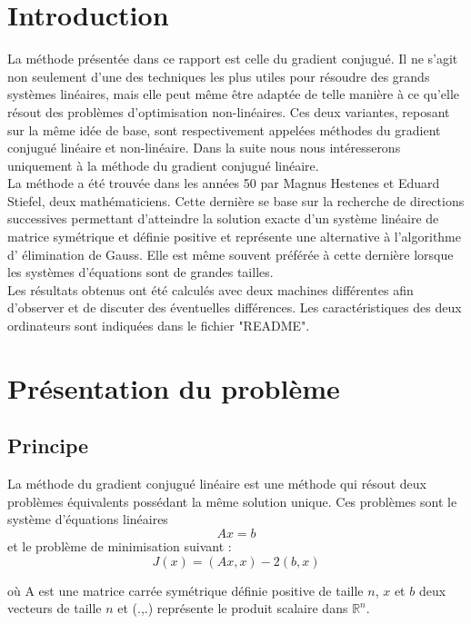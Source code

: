 \documentclass[12,french]{report}
\begin{document}
\tableofcontents

\listoffigures

\renewcommand{\chaptername}{}
\chapter*{Introduction}

La méthode présentée dans ce rapport est celle du gradient conjugué. Il ne s'agit non seulement d'une des techniques les plus utiles pour résoudre des grands systèmes linéaires, mais elle peut même être adaptée de telle manière à ce qu'elle résout des problèmes d'optimisation non-linéaires. Ces deux variantes, reposant sur la même idée de base, sont respectivement appelées méthodes du gradient conjugué linéaire et non-linéaire. Dans la suite nous nous intéresserons uniquement à la méthode du gradient conjugué linéaire.\\

La méthode a été trouvée dans les années 50 par Magnus Hestenes et Eduard Stiefel, deux mathématiciens. Cette dernière se base sur la recherche de directions successives permettant d’atteindre la solution exacte d’un système linéaire de matrice symétrique et définie positive et représente une alternative à l’algorithme d’ élimination de Gauss. Elle est même souvent préférée à cette dernière lorsque les systèmes d’équations sont de grandes tailles.\\

Les résultats obtenus ont été calculés avec deux machines différentes afin d'observer et de discuter des éventuelles différences. Les caractéristiques des deux ordinateurs sont indiquées dans le fichier "README".


\chapter{Présentation du problème}

\section{Principe}

La méthode du gradient conjugué linéaire est une méthode qui résout deux problèmes équivalents
possédant la même solution unique. Ces problèmes sont le système d’équations linéaires
$$Ax = b$$
et le problème de minimisation suivant :
$$J(x)=(Ax,x)-2(b,x)$$

où A est une matrice carrée symétrique définie positive de taille $n$, $x$ et $b$ deux vecteurs de taille $n$ et (.,.) représente le produit scalaire dans $\mathbb{R}^{n}$.
\end{document}
